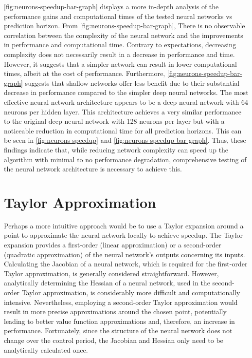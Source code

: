 \autoref{fig:neurons-speedup-bar-graph} displays a more in-depth analysis of the performance gains and computational times of the tested neural networks vs prediction horizon. From \autoref{fig:neurons-speedup-bar-graph}, There is no observable correlation between the complexity of the neural network and the improvements in performance and computational time. Contrary to expectations, decreasing complexity does not necessarily result in a decrease in performance and time. However, it suggests that a simpler network can result in lower computational times, albeit at the cost of performance. Furthermore, \autoref{fig:neurons-speedup-bar-graph} suggests that shallow networks offer less benefit due to their substantial decrease in performance compared to the simpler deep neural networks. The most effective neural network architecture appears to be a deep neural network with 64 neurons per hidden layer. This architecture achieves a very similar performance to the original deep neural network with 128 neurons per layer but with a noticeable reduction in computational time for all prediction horizons. This can be seen in \autoref{fig:neurons-speedup} and \autoref{fig:neurons-speedup-bar-graph}. Thus, these findings indicate that, while reducing network complexity can speed up the algorithm with minimal to no performance degradation, comprehensive testing of the neural network architecture is necessary to achieve this.


\section{Taylor Approximation}

Perhaps a more intuitive approach would be to use a Taylor expansion around a point to approximate the neural network locally to achieve speedup. The Taylor expansion provides a first-order (linear approximation) or a second-order (quadratic approximation) of the neural network’s outputs concerning its inputs. Calculating the Jacobian of a neural network, which is required for the first-order Taylor approximation, is generally considered straightforward. However, analytically determining the Hessian of a neural network, used in the second-order Taylor approximation, is considerably more difficult and computationally intensive. Nevertheless, employing a second-order Taylor approximation would result in more precise approximations around the chosen point, potentially leading to better value function approximations and, therefore, an increase in performance. Fortunately, since the structure of the neural network does not change over the control period, the Jacobian and Hessian only need to be analytically calculated once.

